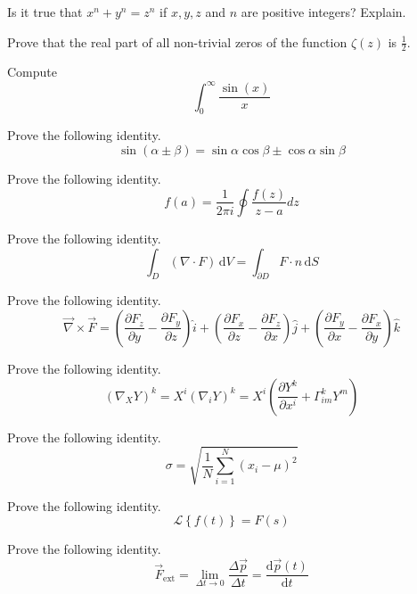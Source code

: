 \documentclass[12pt,a5paper]{exam}
\begin{document}
\begin{center}
\end{center}

\vspace{5mm}

\vspace{5mm}

\begin{questions}
\question Is it true that \(x^n + y^n = z^n\) if \(x,y,z\) and \(n\) are
positive integers? Explain.

\question Prove that the real part of all non-trivial zeros of the function
\(\zeta(z)\) is \(\frac{1}{2}\).

\question Compute \[\int_{0}^{\infty} \frac{\sin(x)}{x}\]

\question 
Prove the following identity.
\[
\sin (\alpha \pm\beta) =\sin\alpha \cos \beta \pm \cos\alpha \sin\beta
\]

\question
Prove the following identity.
\[
f(a) = \frac{1}{2\pi i} \oint\frac{f(z)}{z-a}dz
\]

\question
Prove the following identity.
\[
\int_D ({\nabla\cdot} F)\, \mathrm{d}V =\int_{\partial D} F\cdot n \, \mathrm{d}S
\]


\question
Prove the following identity.
\[
\vec{\nabla} \times \vec{F} =
            \left( \frac{\partial F_z}{\partial y} - \frac{\partial F_y}{\partial z} \right) \hat{i}
          + \left( \frac{\partial F_x}{\partial z} - \frac{\partial F_z}{\partial x} \right) \hat{j}
          + \left( \frac{\partial F_y}{\partial x} - \frac{\partial F_x}{\partial y} \right) \hat{k}
\]


\question
Prove the following identity.
\[
(\nabla_X Y)^k = X^i (\nabla_i Y)^k =
           X^i \left( \frac{\partial Y^k}{\partial x^i} + \Gamma_{im}^k Y^m \right)
\]


\question
Prove the following identity.
\[
\sigma = \sqrt{ \frac{1}{N} \sum_{i=1}^N (x_i -\mu)^2}
\]


\question
Prove the following identity.
\[
\mathscr{L}\left\{f(t)\right\} = F(s)
\]


\question
Prove the following identity.
\[
\vec{F}_\text{ext} = \lim_{\Delta t\to 0} \frac{\Delta \vec{p}}{\Delta t} = \frac{\textrm{d}\vec{p}(t)}{\textrm{d}t}
\]


\end{questions}
\end{document}
